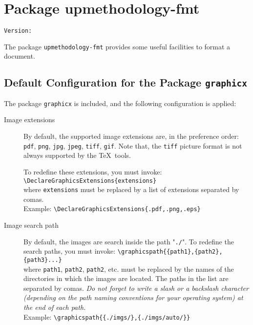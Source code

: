 \documentclass[book]{upmethodology-document}
\makeatletter
\let\VERfmt\upm@package@fmt@ver
\makeatother
\begin{document}

\chapter{Package upmethodology-fmt}

\begin{center}
	\texttt{Version: \VERfmt}
\end{center}

The package \texttt{upmethodology-fmt} provides some useful facilities to format a document.

\section{Default Configuration for the Package \texttt{graphicx}}

The package \texttt{graphicx} is included, and the following configuration is applied:
\begin{description}
\item[Image extensions] By default, the supported image extensions are, in the preference order: \texttt{pdf}, \texttt{png}, \texttt{jpg}, \texttt{jpeg}, \texttt{tiff}, \texttt{gif}. Note that, the \texttt{tiff} picture format is not always supported by the \TeX\ tools.

To redefine these extensions, you must invoke:\\
	\texttt{{\textbackslash}DeclareGraphicsExtensions\{extensions\}} \\
	where \texttt{extensions} must be replaced by a list of extensions separated by comas. \\
	Example: \texttt{{\textbackslash}DeclareGraphicsExtensions\{.pdf,.png,.eps\}} \\
\item[Image search path] By default, the images are search inside the path "\texttt{./}". To redefine the search paths, you must invoke:
	\texttt{{\textbackslash}graphicspath\{\{path1\},\{path2\},\{path3\}...\}} \\
	where \texttt{path1}, \texttt{path2}, \texttt{path2}, etc. must be replaced by the names of the directories in which the images are located. The paths in the list are separated by comas. \emph{Do not forget to write a slash or a backslash character (depending on the path naming conventions for your operating system) at the end of each path.} \\
	Example: \texttt{{\textbackslash}graphicspath\{\{./imgs/\},\{./imgs/auto/\}\}} \\
\end{description}
\end{document}
